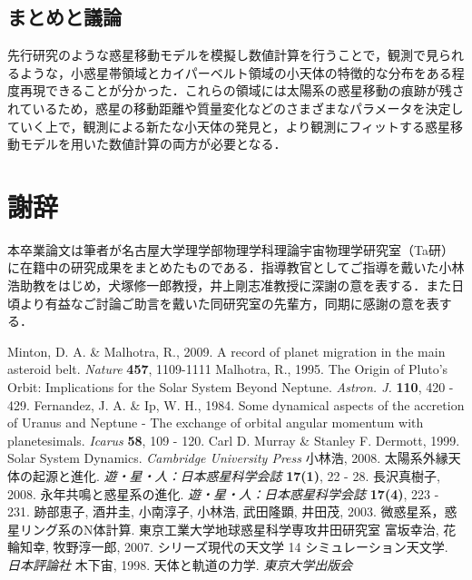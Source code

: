 \documentclass[11pt,a4paper,oneside,onecolumn]{jreport}
\begin{document}
\section{まとめと議論}
先行研究のような惑星移動モデルを模擬し数値計算を行うことで，観測で見られるような，小惑星帯領域とカイパーベルト領域の小天体の特徴的な分布をある程度再現できることが分かった．これらの領域には太陽系の惑星移動の痕跡が残されているため，惑星の移動距離や質量変化などのさまざまなパラメータを決定していく上で，観測による新たな小天体の発見と，より観測にフィットする惑星移動モデルを用いた数値計算の両方が必要となる．


\chapter*{謝辞}
本卒業論文は筆者が名古屋大学理学部物理学科理論宇宙物理学研究室（Ta研）に在籍中の研究成果をまとめたものである．指導教官としてご指導を戴いた小林浩助教をはじめ，犬塚修一郎教授，井上剛志准教授に深謝の意を表する．また日頃より有益なご討論ご助言を戴いた同研究室の先輩方，同期に感謝の意を表する．


\begin{thebibliography}{99}
   Minton, D. A. \& Malhotra, R., 2009. A record of planet migration in the main asteroid belt. {\it Nature} {\bf 457}, 1109-1111
   Malhotra, R., 1995. The Origin of Pluto's Orbit: Implications for the Solar System Beyond Neptune. {\it Astron. J.} {\bf 110}, 420 - 429.
   Fernandez, J. A. \& Ip, W. H., 1984. Some dynamical aspects of the accretion of Uranus and Neptune - The exchange of orbital angular momentum with planetesimals. {\it Icarus} {\bf 58}, 109 - 120.
   Carl D. Murray \& Stanley F. Dermott, 1999. Solar System Dynamics. {\it Cambridge University Press}
   小林浩, 2008. 太陽系外縁天体の起源と進化. {\it 遊・星・人：日本惑星科学会誌} {\bf 17(1)}, 22 - 28.
   長沢真樹子, 2008. 永年共鳴と惑星系の進化. {\it 遊・星・人：日本惑星科学会誌} {\bf 17(4)}, 223 - 231.  
   跡部恵子, 酒井圭, 小南淳子, 小林浩, 武田隆顕, 井田茂, 2003. 微惑星系，惑星リング系のN体計算. 東京工業大学地球惑星科学専攻井田研究室
   富坂幸治, 花輪知幸, 牧野淳一郎, 2007. シリーズ現代の天文学 14 シミュレーション天文学. {\it 日本評論社}
   木下宙, 1998. 天体と軌道の力学. {\it 東京大学出版会}

  
\end{thebibliography}
\end{document}
